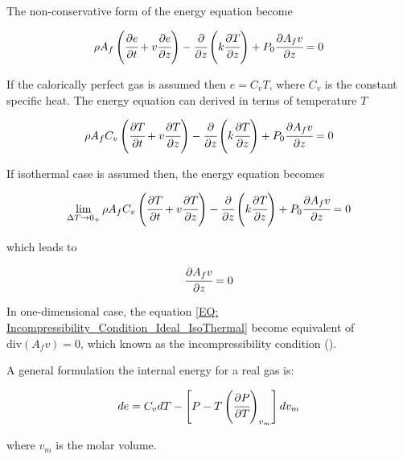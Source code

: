 \documentclass[../Article_Model_Parameters.tex]{subfiles}
\begin{document}
	The non-conservative form of the energy equation become
	
	{\footnotesize
		\begin{equation*}
		\rho A_f \left( \cfrac{\partial e }{\partial t} + v \cfrac{\partial e}{\partial z} \right) - \cfrac{\partial}{\partial z} \left( k \cfrac{\partial T}{\partial z} \right) + P_0 \cfrac{\partial A_f v}{\partial z} = 0
		\end{equation*}
	}
	
	If the calorically perfect gas is assumed then $e=C_vT$, where $C_v$ is the constant specific heat. The energy equation can derived in terms of temperature $T$
	
	{\footnotesize
		\begin{equation*}
			\rho A_f C_v \left( \cfrac{\partial T }{\partial t} + v \cfrac{\partial T}{\partial z} \right) - \cfrac{\partial}{\partial z} \left( k \cfrac{\partial T}{\partial z} \right) + P_0 \cfrac{\partial A_f v}{\partial z} = 0
		\end{equation*}
	}
	
	If isothermal case is assumed then, the energy equation becomes
	
	{\footnotesize
		\begin{equation*}
			\lim_{\Delta T \rightarrow 0_+} \rho A_f C_v \left( \cfrac{\partial T }{\partial t} + v \cfrac{\partial T}{\partial z} \right) - \cfrac{\partial}{\partial z} \left( k \cfrac{\partial T}{\partial z} \right) + P_0 \cfrac{\partial A_f v}{\partial z} = 0
		\end{equation*}
	}
	
	which leads to
	
	{\footnotesize
		\begin{equation}
			\cfrac{\partial A_f v}{\partial z} = 0
			\label{EQ: Incompressibility_Condition_Ideal_IsoThermal}
		\end{equation}
	}
	
	In one-dimensional case, the equation \ref{EQ: Incompressibility_Condition_Ideal_IsoThermal} become equivalent of $\text{div} ( A_f v) = 0$, which known as the incompressibility condition (\citet{Lions2013}). 
	
		A general formulation the internal energy for a real gas is:
	
	{\footnotesize
		\begin{equation*}
			de=C_vdT-\left[P-T\left(\cfrac{\partial P}{\partial T}\right)_{v_m}\right]dv_m
	\end{equation*} }
	
	where $v_m$ is the molar volume.
	
\end{document}
